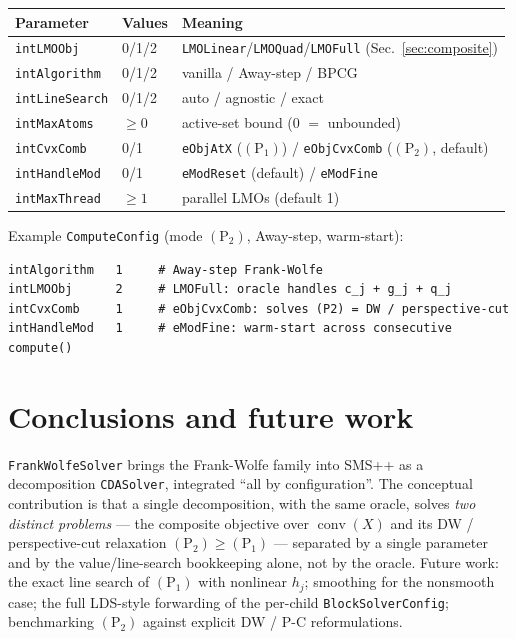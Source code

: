\documentclass[11pt,a4paper]{article}
\newcommand{\conv}{\operatorname{conv}}
\newcommand{\code}[1]{\texttt{#1}}
\newcommand{\Pone}{(\mathrm{P}_1)}
\newcommand{\Ptwo}{(\mathrm{P}_2)}
\theoremstyle{plain}
\theoremstyle{remark}
\begin{document}
\begin{center}
\begin{tabular}{@{}lll@{}}
\toprule
Parameter & Values & Meaning\\
\midrule
\code{intLMOObj}    & 0/1/2 & \code{LMOLinear}/\code{LMOQuad}/\code{LMOFull} (Sec.~\ref{sec:composite})\\
\code{intAlgorithm} & 0/1/2 & vanilla / Away-step / BPCG\\
\code{intLineSearch}& 0/1/2 & auto / agnostic / exact\\
\code{intMaxAtoms}  & $\ge 0$ & active-set bound (0 $=$ unbounded)\\
\code{intCvxComb}   & 0/1 & \code{eObjAtX} ($\Pone$) / \code{eObjCvxComb} ($\Ptwo$, default)\\
\code{intHandleMod} & 0/1 & \code{eModReset} (default) / \code{eModFine}\\
\code{intMaxThread} & $\ge 1$ & parallel LMOs (default 1)\\
\bottomrule
\end{tabular}
\end{center}

\noindent Example \code{ComputeConfig} (mode $\Ptwo$, Away-step, warm-start):
\begin{lstlisting}[style=cfg]
intAlgorithm   1     # Away-step Frank-Wolfe
intLMOObj      2     # LMOFull: oracle handles c_j + g_j + q_j
intCvxComb     1     # eObjCvxComb: solves (P2) = DW / perspective-cut
intHandleMod   1     # eModFine: warm-start across consecutive compute()
\end{lstlisting}

\section{Conclusions and future work}\label{sec:concl}

\code{FrankWolfeSolver} brings the Frank-Wolfe family into SMS++ as a
decomposition \code{CDASolver}, integrated ``all by configuration''. The
conceptual contribution is that a single decomposition, with the same oracle,
solves \emph{two distinct problems} --- the composite objective over $\conv(X)$
and its DW / perspective-cut relaxation $\Ptwo\ge\Pone$ --- separated by a single
parameter and by the value/line-search bookkeeping alone, not by the oracle.
Future work: the exact line search of $\Pone$ with nonlinear $h_j$; smoothing for
the nonsmooth case; the full LDS-style forwarding of the per-child
\code{BlockSolverConfig}; benchmarking $\Ptwo$ against explicit DW / P-C
reformulations.
\end{document}
